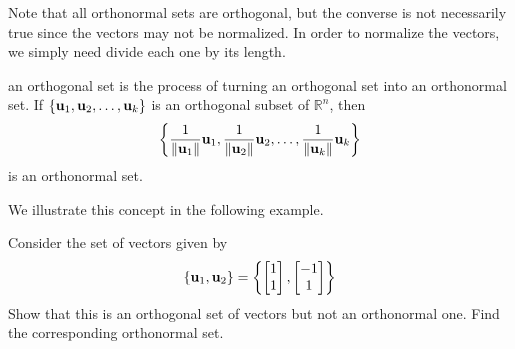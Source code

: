 \documentclass{ximera}
\begin{document}
Note that all orthonormal sets are orthogonal, but the converse is not
necessarily true since the vectors may not be normalized. In order to
normalize the vectors, we simply need divide each one by its length.

\begin{definition}\label{normalizing}
 an orthogonal set is the process of turning an orthogonal set into an orthonormal set.
If $\{ {\bf u}_1, {\bf u}_2, \ldots, {\bf u}_k\}$
is an orthogonal subset of $\mathbb{R}^n$,
then
\[ \left\{
\frac{1}{\left\lVert{\bf u}_1\right\rVert}{\bf u}_1,
\frac{1}{\left\lVert{\bf u}_2\right\rVert}{\bf u}_2, \ldots,
\frac{1}{\left\lVert{\bf u}_k\right\rVert}{\bf u}_k \right\}
\]
is an orthonormal set.
\end{definition}

We illustrate this concept in the following example.

\begin{example}\label{ex:orthonormalset}
Consider the set of vectors  given by
\[
\left\{ {\bf u}_1, {\bf u}_2 \right\} = \left\{
\begin{bmatrix}
1 \\
1
\end{bmatrix},
\begin{bmatrix}
-1 \\
1
\end{bmatrix}
\right\}
\]
Show that this is an orthogonal set of vectors  but not an orthonormal one. Find the corresponding orthonormal set.
\end{example}
\end{document}
